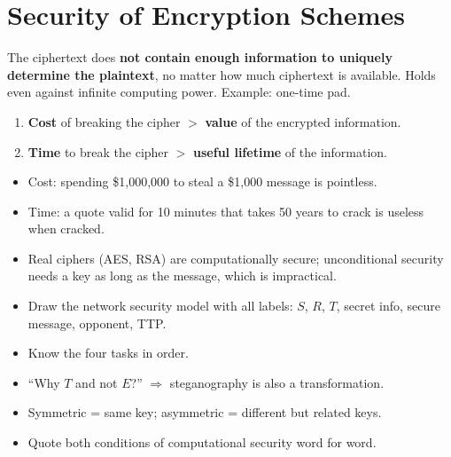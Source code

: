 \documentclass[10pt,a4paper]{article}
\begin{document}
\section{Security of Encryption Schemes}

\begin{keybox}[title=Unconditionally secure]
The ciphertext does \textbf{not contain enough information to uniquely determine the plaintext}, no matter how much ciphertext is available. Holds even against infinite computing power. Example: one-time pad.
\end{keybox}

\begin{keybox}[title=Computationally secure (either condition)]
\begin{enumerate}[leftmargin=1.5em]
  \item \textbf{Cost} of breaking the cipher $>$ \textbf{value} of the encrypted information.
  \item \textbf{Time} to break the cipher $>$ \textbf{useful lifetime} of the information.
\end{enumerate}
\end{keybox}
\begin{itemize}
  \item Cost: spending \$1{,}000{,}000 to steal a \$1{,}000 message is pointless.
  \item Time: a quote valid for 10 minutes that takes 50 years to crack is useless when cracked.
  \item Real ciphers (AES, RSA) are computationally secure; unconditional security needs a key as long as the message, which is impractical.
\end{itemize}

\begin{examtip}
\begin{itemize}
  \item Draw the network security model with all labels: $S$, $R$, $T$, secret info, secure message, opponent, TTP.
  \item Know the four tasks in order.
  \item ``Why $T$ and not $E$?'' $\Rightarrow$ steganography is also a transformation.
  \item Symmetric = same key; asymmetric = different but related keys.
  \item Quote both conditions of computational security word for word.
\end{itemize}
\end{examtip}
\end{document}
